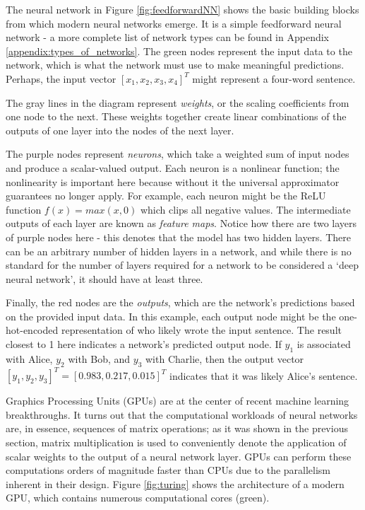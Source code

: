 \documentclass[12pt,letterpaper]{article}
\begin{document}
The neural network in Figure \ref{fig:feedforwardNN} shows the basic building blocks from which modern neural networks emerge. It is a simple feedforward neural network - a more complete list of network types can be found in Appendix \ref{appendix:types_of_networks}. The green nodes represent the input data to the network, which is what the network must use to make meaningful predictions. Perhaps, the input vector $[x_1,x_2,x_3,x_4]^T$ might represent a four-word sentence.\par

The gray lines in the diagram represent \textit{weights}, or the scaling coefficients from one node to the next. These weights together create linear combinations of the outputs of one layer into the nodes of the next layer. \par 

The purple nodes represent \textit{neurons}, which take a weighted sum of input nodes and produce a scalar-valued output. Each neuron is a nonlinear function; the nonlinearity is important here because without it the universal approximator guarantees no longer apply. For example, each neuron might be the ReLU function $f(x)=max(x,0)$ which clips all negative values. The intermediate outputs of each layer are known as \textit{feature maps}. Notice how there are two layers of purple nodes here - this denotes that the model has two hidden layers. There can be an arbitrary number of hidden layers in a network, and while there is no standard for the number of layers required for a network to be considered a \enquote*{deep neural network}, it should have at least three. \par 

Finally, the red nodes are the \textit{outputs}, which are the network's predictions based on the provided input data. In this example, each output node might be the one-hot-encoded representation of who likely wrote the input sentence. The result closest to 1 here indicates a network's predicted output node. If $y_1$ is associated with Alice, $y_2$ with Bob, and $y_3$ with Charlie, then the output vector $[y_1,y_2,y_3]^T = [0.983,0.217,0.015]^T$ indicates that it was likely Alice's sentence.

Graphics Processing Units (GPUs) are at the center of recent machine learning breakthroughs. It turns out that the computational workloads of neural networks are, in essence, sequences of matrix operations; as it was shown in the previous section, matrix multiplication is used to conveniently denote the application of scalar weights to the output of a neural network layer. GPUs can perform these computations orders of magnitude faster than CPUs due to the parallelism inherent in their design.  Figure \ref{fig:turing} shows the architecture of a modern GPU, which contains numerous computational cores (green).
\end{document}
